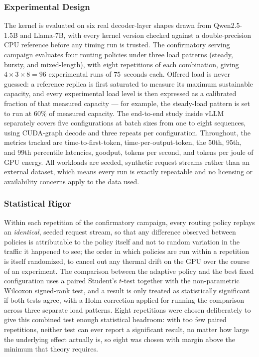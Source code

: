 \documentclass[11pt,a4paper]{article}
\begin{document}
\subsubsection*{Experimental Design}
The kernel is evaluated on six real decoder-layer shapes drawn from Qwen2.5-1.5B and Llama-7B, with every kernel
version checked against a double-precision CPU reference before any timing run is trusted. The confirmatory serving
campaign evaluates four routing policies under three load patterns (steady, bursty, and mixed-length), with eight
repetitions of each combination, giving $4 \times 3 \times 8 = 96$ experimental runs of 75~seconds each. Offered
load is never guessed: a reference replica is first saturated to measure its maximum sustainable capacity, and every
experimental load level is then expressed as a calibrated fraction of that measured capacity --- for example, the
steady-load pattern is set to run at 60\% of measured capacity. The end-to-end study inside vLLM separately covers
five configurations at batch sizes from one to eight sequences, using CUDA-graph decode and three repeats per
configuration. Throughout, the metrics tracked are time-to-first-token, time-per-output-token, the 50th, 95th, and
99th percentile latencies, goodput, tokens per second, and tokens per joule of GPU energy. All workloads are seeded,
synthetic request streams rather than an external dataset, which means every run is exactly repeatable and no
licensing or availability concerns apply to the data used.

\subsubsection*{Statistical Rigor}
Within each repetition of the confirmatory campaign, every routing policy replays an \emph{identical}, seeded
request stream, so that any difference observed between policies is attributable to the policy itself and not to
random variation in the traffic it happened to see; the order in which policies are run within a repetition is
itself randomized, to cancel out any thermal drift on the GPU over the course of an experiment. The comparison
between the adaptive policy and the best fixed configuration uses a paired Student's $t$-test together with the
non-parametric Wilcoxon signed-rank test, and a result is only treated as statistically significant if both tests
agree, with a Holm correction applied for running the comparison across three separate load patterns. Eight
repetitions were chosen deliberately to give this combined test enough statistical headroom: with too few paired
repetitions, neither test can ever report a significant result, no matter how large the underlying effect actually
is, so eight was chosen with margin above the minimum that theory requires.
\end{document}
